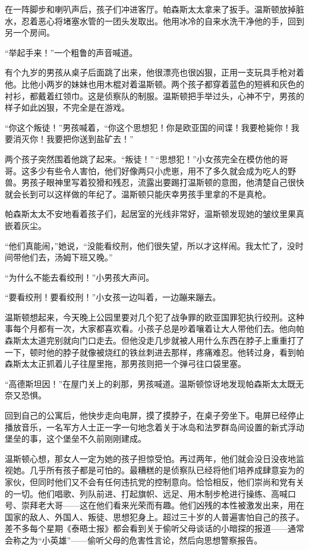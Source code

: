 在一阵脚步和喇叭声后，孩子们冲进客厅。帕森斯太太拿来了扳手。温斯顿放掉脏水，忍着恶心将堵塞水管的一团头发取出。他用冰冷的自来水洗干净他的手，回到另一个房间。

``举起手来！''一个粗鲁的声音喊道。

有个九岁的男孩从桌子后面跳了出来，他很漂亮也很凶狠，正用一支玩具手枪对着他。比他小两岁的妹妹也用木棍对着温斯顿。两个孩子都穿着蓝色的短裤和灰色的衬衫，都戴着红领巾。这是侦察队的制服。温斯顿把手举过头，心神不宁，男孩的样子如此凶狠，不完全是在游戏。

``你这个叛徒！''男孩喊着，``你这个思想犯！你是欧亚国的间谍！我要枪毙你！我要消灭你！我要把你送到盐矿去！''

两个孩子突然围着他跳了起来。``叛徒！''\,``思想犯！''小女孩完全在模仿他的哥哥。这多少有些令人害怕，他们好像两只小虎崽，用不了多久就会成为吃人的野兽。男孩子眼神里写着狡猾和残忍，流露出要踢打温斯顿的意图，他清楚自己很快就会长到可以这样做的年纪了。温斯顿只能庆幸男孩手里拿的不是真枪。

帕森斯太太不安地看着孩子们，起居室的光线非常好，温斯顿发现她的皱纹里果真嵌着灰尘。

``他们真能闹，''她说，``没能看绞刑，他们很失望，所以才这样闹。我太忙了，没时间带他们去，汤姆下班又晚。''

``为什么不能去看绞刑！''小男孩大声问。

``要看绞刑！要看绞刑！''小女孩一边叫着，一边蹦来蹦去。

温斯顿想起来，今天晚上公园里要对几个犯了战争罪的欧亚国罪犯执行绞刑。这种事每个月都有一次，大家都喜欢看。小孩子总是吵着嚷着让大人带他们去。他向帕森斯太太道完别就向门口走去。但他没走几步就被人用什么东西在脖子上重重打了一下，顿时他的脖子就像被烧红的铁丝刺进去那样，疼痛难忍。他转过身，看到帕森斯太太正抓着儿子往屋里拖，那男孩则把一个弹弓往口袋里塞。

``高德斯坦因！''在屋门关上的刹那，男孩喊道。温斯顿惊讶地发现帕森斯太太既无奈又恐惧。

回到自己的公寓后，他快步走向电屏，摸了摸脖子，在桌子旁坐下。电屏已经停止播放音乐，一名军方人士正一字一句地念着关于冰岛和法罗群岛间设置的新式浮动堡垒的事，这个堡垒不久前刚刚建成。

温斯顿心想，那女人一定为她的孩子担惊受怕。再过两年，他们就会没日没夜地监视她。几乎所有孩子都是可怕的。最糟糕的是侦察队已经将他们培养成肆意妄为的家伙，但同时他们又不会有任何违抗党的控制意向。恰恰相反，他们崇尚和党有关的一切。他们唱歌、列队前进、打起旗帜、远足、用木制步枪进行操练、高喊口号、崇拜老大哥——这在他们看来光荣而有趣。他们凶残的本性被激发出来，用在国家的敌人、外国人、叛徒、思想犯身上。超过三十岁的人普遍害怕自己的孩子。差不多每个星期《泰晤士报》都会看到关于偷听父母谈话的小暗探的报道——通常会称之为``小英雄''——偷听父母的危害性言论，然后向思想警察报告。

